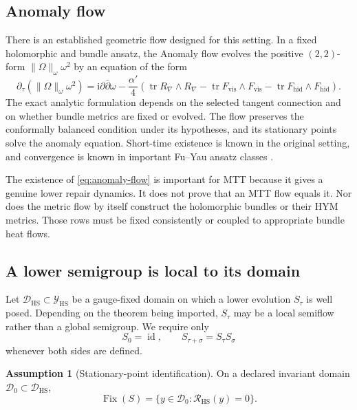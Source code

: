\documentclass[11pt]{article}
\theoremstyle{definition}
\newtheorem{assumption}[theorem]{Assumption}
\theoremstyle{remark}
\newcommand{\ii}{\mathrm i}
\newcommand{\cD}{\mathcal D}
\newcommand{\cR}{\mathcal R}
\newcommand{\cY}{\mathcal Y}
\newcommand{\tr}{\operatorname{tr}}
\newcommand{\Fix}{\operatorname{Fix}}
\begin{document}
\subsection{Anomaly flow}

There is an established geometric flow designed for this setting.  In a fixed
holomorphic and bundle ansatz, the Anomaly flow evolves the positive
\((2,2)\)-form \(\|\Omega\|_\omega\omega^2\) by an equation of the form
\begin{equation}
\partial_\tau\!\left(\|\Omega\|_\omega\omega^2\right)
=\ii\partial\bar\partial\omega
-\frac{\alpha'}4\left(
\tr R_\nabla\wedge R_\nabla
-\tr F_{\mathrm{vis}}\wedge F_{\mathrm{vis}}
-\tr F_{\mathrm{hid}}\wedge F_{\mathrm{hid}}\right).
\label{eq:anomaly-flow}
\end{equation}
The exact analytic formulation depends on the selected tangent connection and
on whether bundle metrics are fixed or evolved.  The flow preserves the
conformally balanced condition under its hypotheses, and its stationary
points solve the anomaly equation.  Short-time existence is known in the
original setting, and convergence is known in important Fu--Yau ansatz
classes \cite{PhongPicardZhang2017,PhongPicardZhang2018}.

The existence of \cref{eq:anomaly-flow} is important for MTT because it gives
a genuine lower repair dynamics.  It does not prove that an MTT flow equals
it.  Nor does the metric flow by itself construct the holomorphic bundles or
their HYM metrics.  Those rows must be fixed consistently or coupled to
appropriate bundle heat flows.

\subsection{A lower semigroup is local to its domain}

Let \(\cD_{\mathrm{HS}}\subset\cY_{\mathrm{HS}}\) be a gauge-fixed domain on
which a lower evolution \(S_\tau\) is well posed.  Depending on the theorem
being imported, \(S_\tau\) may be a local semiflow rather than a global
semigroup.  We require only
\[
S_0=\operatorname{id},\qquad
S_{\tau+\sigma}=S_\tau S_\sigma
\]
whenever both sides are defined.

\begin{assumption}[Stationary-point identification]
\label{ass:stationary}
On a declared invariant domain \(\cD_0\subset\cD_{\mathrm{HS}}\),
\[
\Fix(S)=\{y\in\cD_0:\cR_{\mathrm{HS}}(y)=0\}.
\]
\end{assumption}
\end{document}
